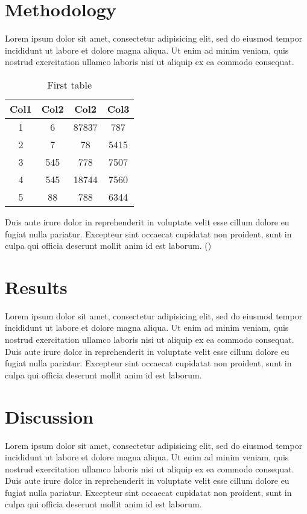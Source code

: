 \documentclass[12pt,a4paper]{article}
\begin{document}
	\section{Methodology}
		Lorem ipsum dolor sit amet, consectetur adipisicing elit, sed do eiusmod tempor incididunt ut labore et dolore magna aliqua. Ut enim ad minim veniam, quis nostrud exercitation ullamco laboris nisi ut aliquip ex ea commodo consequat.
		\begin{table}[h]
			\centering
			 \begin{tabular}{||c c c c||}
			 \hline
			 Col1 & Col2 & Col2 & Col3 \\ [0.5ex]
			 \hline\hline
			 1 & 6 & 87837 & 787 \\
			 \hline
			 2 & 7 & 78 & 5415 \\
			 \hline
			 3 & 545 & 778 & 7507 \\
			 \hline
			 4 & 545 & 18744 & 7560 \\
			 \hline
			 5 & 88 & 788 & 6344 \\ [1ex]
			 \hline
			 \end{tabular}
			\caption{First table}
			\label{tab:table1}
		\end{table}
		Duis aute irure dolor in reprehenderit in voluptate velit esse cillum dolore eu fugiat nulla pariatur. Excepteur sint occaecat cupidatat non proident, sunt in culpa qui officia deserunt mollit anim id est laborum. (\cite{examplecitation})
		\clearpage
	\section{Results}
		Lorem ipsum dolor sit amet, consectetur adipisicing elit, sed do eiusmod tempor incididunt ut labore et dolore magna aliqua. Ut enim ad minim veniam, quis nostrud exercitation ullamco laboris nisi ut aliquip ex ea commodo consequat. Duis aute irure dolor in reprehenderit in voluptate velit esse cillum dolore eu fugiat nulla pariatur. Excepteur sint occaecat cupidatat non proident, sunt in culpa qui officia deserunt mollit anim id est laborum.
		\clearpage
	\section{Discussion}
		Lorem ipsum dolor sit amet, consectetur adipisicing elit, sed do eiusmod tempor incididunt ut labore et dolore magna aliqua. Ut enim ad minim veniam, quis nostrud exercitation ullamco laboris nisi ut aliquip ex ea commodo consequat. Duis aute irure dolor in reprehenderit in voluptate velit esse cillum dolore eu fugiat nulla pariatur. Excepteur sint occaecat cupidatat non proident, sunt in culpa qui officia deserunt mollit anim id est laborum.
		\clearpage
\end{document}
